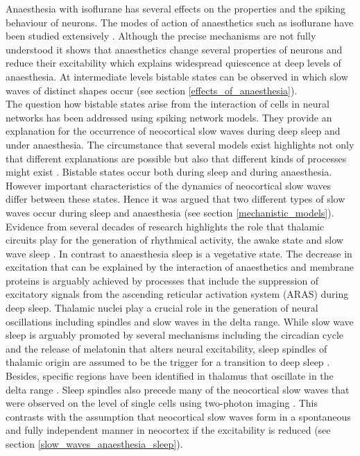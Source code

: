 Anaesthesia with isoflurane has several effects on the properties and the spiking behaviour of neurons. The modes of action of anaesthetics such as isoflurane have been studied extensively \parencite{qazzaz2017modulation, moghadam2019comparative, eger1981isoflurane, jenkins1999effects}. Although the precise mechanisms are not fully understood it shows that anaesthetics change several properties of neurons and reduce their excitability which explains widespread quiescence at deep levels of anaesthesia. At intermediate levels bistable states can be observed in which slow waves of distinct shapes occur (see section \ref{effects_of_anaesthesia}).\\
The question how bistable states arise from the interaction of cells in neural networks has been addressed using spiking network models. They provide an explanation for the occurrence of neocortical slow waves during deep sleep and under anaesthesia. The circumstance that several models exist highlights not only that different explanations are possible but also that different kinds of processes might exist \parencite{nghiem2018two}. Bistable states occur both during sleep and during anaesthesia. However important characteristics of the dynamics of neocortical slow waves differ between these states. Hence it was argued that two different types of slow waves occur during sleep and anaesthesia (see section \ref{mechanistic_models}). \\
Evidence from several decades of research highlights the role that thalamic circuits play for the generation of rhythmical activity, the awake state and slow wave sleep \parencite{brown2012control}. In contrast to anaesthesia sleep is a vegetative state. The decrease in excitation that can be explained by the interaction of anaesthetics and membrane proteins is arguably achieved by processes that include the suppression of excitatory signals from the ascending reticular activation system (ARAS) during deep sleep. Thalamic nuclei play a crucial role in the generation of neural oscillations including spindles and slow waves in the delta range. While slow wave sleep is arguably promoted by several mechanisms including the circadian cycle and the release of melatonin that alters neural excitability, sleep spindles of thalamic origin are assumed to be the trigger for a transition to deep sleep \parencite[p. 347]{montagna2005fatal}. Besides, specific regions have been identified in thalamus that oscillate in the delta range \parencite{steriade1984thalamus}. Sleep spindles also precede many of the neocortical slow waves that were observed on the level of single cells using two-photon imaging \parencite{niethard2018cortical}. This contrasts with the assumption that neocortical slow waves form in a spontaneous and fully independent manner in neocortex if the excitability is reduced (see section \ref{slow_waves_anaesthesia_sleep}).\\

